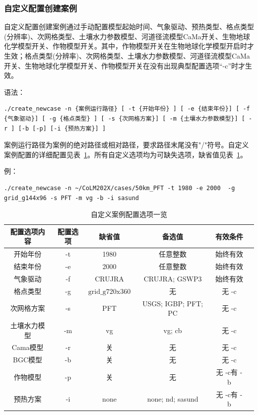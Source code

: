 \subsubsection{自定义配置创建案例}

自定义配置创建案例通过手动配置模型起始时间、气象驱动、预热类型、格点类型(分辨率)、次网格类型、土壤水力参数模型、河道径流模型CaMa开关、生物地球化学模型开关、作物模型开关。其中，作物模型开关在生物地球化学模型开启时才生效；格点类型(分辨率)、次网格类型、土壤水力参数模型、河道径流模型CaMa开关、生物地球化学模型开关、作物模型开关在没有出现典型配置选项“-c”时才生效。

语法：
\begin{lstlisting}[xleftmargin=2.5em]
./create_newcase -n {案例运行路径} [ -t {开始年份} ] [ -e {结束年份}] [ -f {气象驱动}] [ -g {格点类型} ] [ -s {次网格方案}] [ -m {土壤水力参数模型}] [ -r ] [-b [-p] [-i {预热方案}] ]
\end{lstlisting}

案例运行路径为案例的绝对路径或相对路径，要求路径末尾没有"/"符号。自定义案例配置的详细配置见表~\ref{tab:custom_option}。所有自定义选项均为可缺失选项，缺省值见表~\ref{tab:custom_option}。

例：
\begin{lstlisting}[xleftmargin=2.5em]
./create_newcase -n ~/CoLM202X/cases/50km_PFT -t 1980 -e 2000  -g grid_g144x96 -s PFT -m vg -b -i sasund
\end{lstlisting}

\begin{table}[!htbp]
\renewcommand{\arraystretch}{1.5}
\centering
\caption{自定义案例配置选项一览}\label{tab:custom_option}
\begin{tabular}{
cccccc} \toprule
\textbf{配置选项内容} & \textbf{配置选项} & \textbf{缺省值} & \textbf{备选值} & \textbf{有效条件}\\ \midrule
开始年份 & -t & 1980 & 任意整数 & 始终有效\\
结束年份 & -e & 2000 & 任意整数 & 始终有效\\
气象驱动 & -f & CRUJRA & CRUJRA; GSWP3  & 始终有效\\
格点类型 & -g & $\mathrm{grid}\_\mathrm{g}720\mathrm{x}360$ & 无& 无 -c\\
次网格方案 & -s & PFT & USGS; IGBP; PFT; PC & 无 -c\\
土壤水力模型 & -m & vg & vg; cb& 无 -c\\
Cama模型 & -r & 关 & 无& 无 -c\\
BGC模型 & -b & 关 & 无& 无 -c\\
作物模型 & -p & 关 & 无& 无 -c有 -b\\
预热方案 & -i & none & none; nd; sasund& 无 -c有 -b\\
\bottomrule
\end{tabular}
\end{table}

